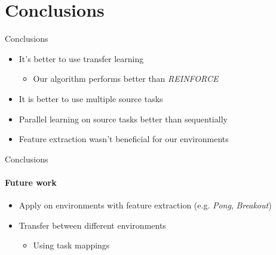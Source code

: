 \section{Conclusions}
\begin{frame}[fragile]{Conclusions}
\begin{itemize}
    \item It's better to use transfer learning
    \begin{itemize}
        \item Our algorithm performs better than \textit{REINFORCE}
    \end{itemize}
    \item It is better to use multiple source tasks
    \item Parallel learning on source tasks better than sequentially
    \item Feature extraction wasn't beneficial for our environments
\end{itemize}
\end{frame}

\begin{frame}[fragile]{Conclusions}
\framesubtitle{Future work}
\begin{itemize}
    \item Apply on environments with feature extraction (e.g. \textit{Pong}, \textit{Breakout})
    \item Transfer between different environments
    \begin{itemize}
        \item Using task mappings
    \end{itemize}
\end{itemize}
\end{frame}

